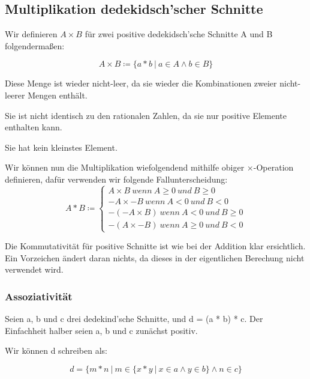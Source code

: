 \documentclass[12pt]{article}
\begin{document}
    \subsection{Multiplikation dedekidsch'scher Schnitte}

    Wir definieren $A \times B$ für zwei positive dedekidsch'sche Schnitte A und B folgendermaßen:

    \[A \times B \coloneqq \{a * b \mspace{4mu} | \mspace{4mu} a \in A \land b \in B\}\]

    Diese Menge ist wieder nicht-leer, da sie wieder die Kombinationen zweier nicht-leerer Mengen enthält.

    Sie ist nicht identisch zu den rationalen Zahlen, da sie nur positive Elemente enthalten kann.

    Sie hat kein kleinstes Element.

    Wir können nun die Multiplikation wiefolgendend mithilfe obiger $\times$-Operation definieren,
    dafür verwenden wir folgende Fallunterscheidung:
    \[
        A * B \coloneqq
        \begin{cases}
            A \times B \mspace{4mu} wenn \mspace{4mu} A \ge 0 \mspace{4mu} und \mspace{4mu} B \ge 0 \\
            -A \times -B \mspace{4mu} wenn \mspace{4mu} A < 0 \mspace{4mu} und \mspace{4mu} B < 0 \\
            -(-A \times B) \mspace{4mu} wenn \mspace{4mu} A < 0 \mspace{4mu} und \mspace{4mu} B \ge 0  \\
            -(A \times -B) \mspace{4mu} wenn \mspace{4mu} A \ge 0 \mspace{4mu} und \mspace{4mu} B < 0
        \end{cases}
    \]

    Die Kommutativität für positive Schnitte ist wie bei der Addition klar ersichtlich.
    Ein Vorzeichen ändert daran nichts, da dieses in der eigentlichen Berechung nicht verwendet wird.

    \subsubsection{Assoziativität}

    Seien a, b und c drei dedekind'sche Schnitte, und d = (a * b) * c.
    Der Einfachheit halber seien a, b und c zunächst positiv.

    Wir können d schreiben als:

    \[d = \{m * n \mspace{4mu} | \mspace{4mu} m \in \{x * y \mspace{4mu} | \mspace{4mu} x \in a \land y \in b\} \land n \in c\}\]
\end{document}
